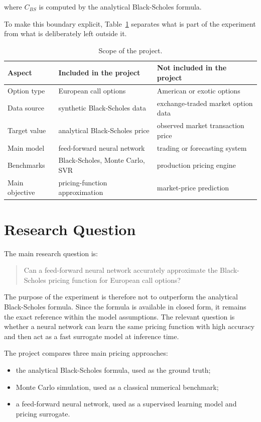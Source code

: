 where $C_{BS}$ is computed by the analytical Black-Scholes formula.

To make this boundary explicit, Table~\ref{tab:project-scope} separates what is part of the experiment from what is deliberately left outside it.

\begin{table}[H]
    \centering
    \begin{tabular}{lll}
        \toprule
        Aspect & Included in the project & Not included in the project \\
        \midrule
        Option type & European call options & American or exotic options \\
        Data source & synthetic Black-Scholes data & exchange-traded market option data \\
        Target value & analytical Black-Scholes price & observed market transaction price \\
        Main model & feed-forward neural network & trading or forecasting system \\
        Benchmarks & Black-Scholes, Monte Carlo, SVR & production pricing engine \\
        Main objective & pricing-function approximation & market-price prediction \\
        \bottomrule
    \end{tabular}
    \caption{Scope of the project.}
    \label{tab:project-scope}
\end{table}

\section{Research Question}

The main research question is:

\begin{quote}
    Can a feed-forward neural network accurately approximate the Black-Scholes pricing function for European call options?
\end{quote}

The purpose of the experiment is therefore not to outperform the analytical Black-Scholes formula.
Since the formula is available in closed form, it remains the exact reference within the model assumptions.
The relevant question is whether a neural network can learn the same pricing function with high accuracy and then act as a fast surrogate model at inference time.

The project compares three main pricing approaches:
\begin{itemize}
    \item the analytical Black-Scholes formula, used as the ground truth;
    \item Monte Carlo simulation, used as a classical numerical benchmark;
    \item a feed-forward neural network, used as a supervised learning model and pricing surrogate.
\end{itemize}

